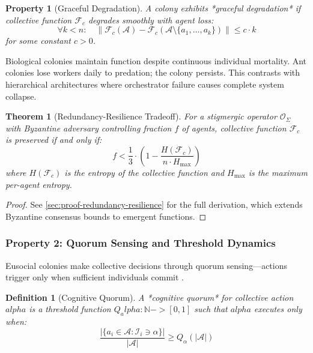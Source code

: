 \documentclass[
]{article}
\newtheorem{definition}{Definition}[section]
\newtheorem{theorem}{Theorem}[section]
\newtheorem{property}{Property}[section]
\begin{document}
\begin{property}[Graceful Degradation]
\label{prop:graceful-degradation}
A colony exhibits *graceful degradation* if collective function $\mathcal{F}_c$ degrades smoothly with agent loss:
\begin{equation}
\label{eq:graceful-degradation}
\forall k < n: \quad \left\| \mathcal{F}_c(\mathcal{A}) - \mathcal{F}_c(\mathcal{A} \setminus \{a_1, \ldots, a_k\}) \right\| \leq c \cdot k
\end{equation}
for some constant $c > 0$.
\end{property}

Biological colonies maintain function despite continuous individual
mortality. Ant colonies lose workers daily to predation; the colony
persists. This contrasts with hierarchical architectures where
orchestrator failure causes complete system collapse.

\begin{theorem}[Redundancy-Resilience Tradeoff]
\label{thm:redundancy-resilience}
For a stigmergic operator $\mathcal{O}_\Sigma$ with Byzantine adversary controlling fraction $f$ of agents, collective function $\mathcal{F}_c$ is preserved if and only if:
\begin{equation}
\label{eq:redundancy-condition}
f < \frac{1}{3} \cdot \left(1 - \frac{H(\mathcal{F}_c)}{n \cdot H_{\max}}\right)
\end{equation}
where $H(\mathcal{F}_c)$ is the entropy of the collective function and $H_{\max}$ is the maximum per-agent entropy.
\end{theorem}

\begin{proof}
See \cref{sec:proof-redundancy-resilience} for the full derivation, which extends Byzantine consensus bounds to emergent functions.
\end{proof}

\subsubsection{Property 2: Quorum Sensing and Threshold
Dynamics}\label{sec:quorum-sensing}

Eusocial colonies make collective decisions through quorum
sensing---actions trigger only when sufficient individuals commit
\citep{seeley2010honeybee}.

\begin{definition}[Cognitive Quorum]
\label{def:cognitive-quorum}
A *cognitive quorum* for collective action $alpha$ is a threshold function $Q_alpha: \mathbb{N} -> [0, 1]$ such that $alpha$ executes only when:
\begin{equation}
\label{eq:quorum-eusocial}
\frac{|\{a_i \in \mathcal{A} : \mathcal{I}_i \ni \alpha\}|}{|\mathcal{A}|} \geq Q_\alpha(|\mathcal{A}|)
\end{equation}
\end{definition}
\end{document}
